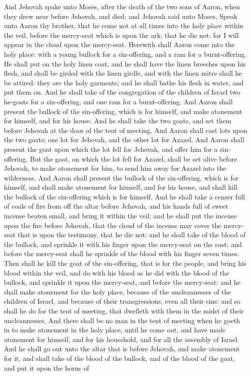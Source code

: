 And Jehovah spake unto Moses, after the death of the two sons of Aaron, when they drew near before Jehovah, and died; and Jehovah said unto Moses, Speak unto Aaron thy brother, that he come not at all times into the holy place within the veil, before the mercy-seat which is upon the ark; that he die not: for I will appear in the cloud upon the mercy-seat. Herewith shall Aaron come into the holy place: with a young bullock for a sin-offering, and a ram for a burnt-offering. He shall put on the holy linen coat, and he shall have the linen breeches upon his flesh, and shall be girded with the linen girdle, and with the linen mitre shall he be attired: they are the holy garments; and he shall bathe his flesh in water, and put them on. And he shall take of the congregation of the children of Israel two he-goats for a sin-offering, and one ram for a burnt-offering.  And Aaron shall present the bullock of the sin-offering, which is for himself, and make atonement for himself, and for his house. And he shall take the two goats, and set them before Jehovah at the door of the tent of meeting. And Aaron shall cast lots upon the two goats; one lot for Jehovah, and the other lot for Azazel. And Aaron shall present the goat upon which the lot fell for Jehovah, and offer him for a sin-offering. But the goat, on which the lot fell for Azazel, shall be set alive before Jehovah, to make atonement for him, to send him away for Azazel into the wilderness.  And Aaron shall present the bullock of the sin-offering, which is for himself, and shall make atonement for himself, and for his house, and shall kill the bullock of the sin-offering which is for himself. And he shall take a censer full of coals of fire from off the altar before Jehovah, and his hands full of sweet incense beaten small, and bring it within the veil: and he shall put the incense upon the fire before Jehovah, that the cloud of the incense may cover the mercy-seat that is upon the testimony, that he die not: and he shall take of the blood of the bullock, and sprinkle it with his finger upon the mercy-seat on the east; and before the mercy-seat shall he sprinkle of the blood with his finger seven times.  Then shall he kill the goat of the sin-offering, that is for the people, and bring his blood within the veil, and do with his blood as he did with the blood of the bullock, and sprinkle it upon the mercy-seat, and before the mercy-seat: and he shall make atonement for the holy place, because of the uncleannesses of the children of Israel, and because of their transgressions, even all their sins: and so shall he do for the tent of meeting, that dwelleth with them in the midst of their uncleannesses. And there shall be no man in the tent of meeting when he goeth in to make atonement in the holy place, until he come out, and have made atonement for himself, and for his household, and for all the assembly of Israel. And he shall go out unto the altar that is before Jehovah, and make atonement for it, and shall take of the blood of the bullock, and of the blood of the goat, and put it upon the horns of 